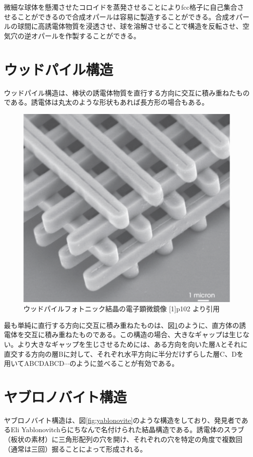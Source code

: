 \documentclass[platex,dvipdfmx,draft]{jsreport}
\numberwithin{equation}{section}
\begin{document}
微細な球体を懸濁させたコロイドを蒸発させることによりfcc格子に自己集合させることができるので合成オパールは容易に製造することができる。合成オパールの球間に高誘電体物質を浸透させ、球を溶解させることで構造を反転させ、空気穴の逆オパールを作製することができる。

\section{ウッドパイル構造}
ウッドパイル構造は、棒状の誘電体物質を直行する方向に交互に積み重ねたものである。誘電体は丸太のような形状もあれば長方形の場合もある。
\begin{figure}[htbp]
  \centering
  \includegraphics[width=0.6\linewidth]{woodpile.png}
  \caption{ウッドパイルフォトニック結晶の電子顕微鏡像 [1]p102 より引用}
  \label{fig:woodpile}

\end{figure}
最も単純に直行する方向に交互に積み重ねたものは、図\ref{fig:woodpile}のように、直方体の誘電体を交互に積み重ねたものである。この構造の場合、大きなギャップは生じない。より大きなギャップを生じさせるためには、ある方向を向いた層Aとそれに直交する方向の層Bに対して、それぞれ水平方向に半分だけずらした層C、Dを用いてABCDABCD$\cdots$のように並べることが有効である。

\section{ヤブロノバイト構造}
ヤブロノバイト構造は、図\ref{fig:yablonovite}のような構造をしており、発見者であるEli Yablonovitchらにちなんで名付けられた結晶構造である。誘電体のスラブ（板状の素材）に三角形配列の穴を開け、それぞれの穴を特定の角度で複数回（通常は三回）掘ることによって形成される。
\end{document}
